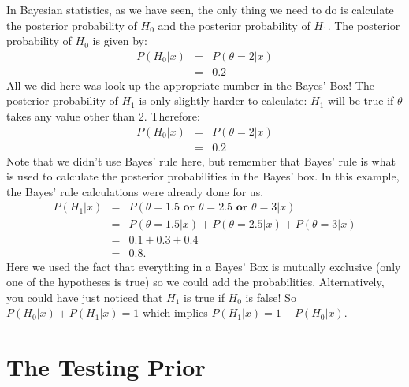 In Bayesian statistics, as we have seen, the only thing we need to do is calculate
the posterior probability of $H_0$ and the posterior probability of $H_1$.
The posterior probability of $H_0$ is given by:
\begin{eqnarray}
P(H_0|x) &=& P(\theta = 2|x)\\
&=& 0.2
\end{eqnarray}
All we did here was look up the appropriate number in the Bayes' Box! The
posterior probability of $H_1$ is only slightly harder to calculate: $H_1$ will
be true if $\theta$ takes any value other than 2. Therefore:
\begin{eqnarray}
P(H_0|x) &=& P(\theta = 2|x)\\
&=& 0.2
\end{eqnarray}
Note that we didn't use Bayes' rule here, but remember that Bayes' rule is
what is used to calculate the posterior probabilities in the Bayes' box. In this
example, the Bayes' rule calculations were already done for us.
\begin{eqnarray}
P(H_1|x) &=& P(\theta = 1.5 \textbf{ or } \theta = 2.5 \textbf{ or } \theta = 3|x)\\
&=& P(\theta = 1.5|x) + P(\theta = 2.5|x) + P(\theta = 3|x)\\
&=& 0.1 + 0.3 + 0.4\\
&=& 0.8.
\end{eqnarray}
Here we used the fact that everything in a Bayes' Box is mutually exclusive
(only one of the hypotheses is true) so we could add the probabilities.
Alternatively, you could have just noticed that $H_1$ is true if $H_0$ is false!
So $P(H_0|x) + P(H_1|x) = 1$ which implies $P(H_1|x) = 1 - P(H_0|x)$.

\section{The Testing Prior}

